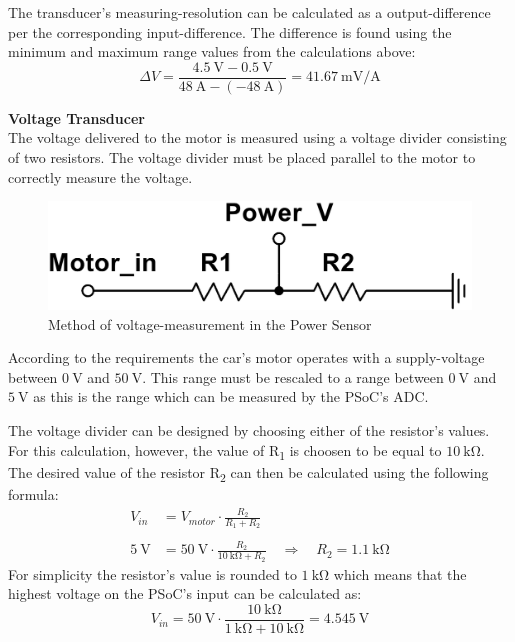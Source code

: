The transducer's measuring-resolution can be calculated as a output-difference per the corresponding input-difference. The difference is found using the minimum and maximum range values from the calculations above:
\begin{equation}
	\Delta V = \frac{\SI{4.5}{\volt} - \SI{0.5}{\volt}}{\SI{48}{\ampere} - (\SI{-48}{\ampere})} = \SI[per-mode = fraction]{41.67}{\milli \volt \per \ampere}
\end{equation}

\textbf{Voltage Transducer}\\
The voltage delivered to the motor is measured using a voltage divider consisting of two resistors. The voltage divider must be placed parallel to the motor to correctly measure the voltage.

\begin{figure}[H]
	\centering
	\includegraphics[width=0.5\linewidth]{Hardware/Pictures/PowerSensor_Voltage}
	\caption{Method of voltage-measurement in the Power Sensor}
	\label{fig:PowerSensorCurrent}
\end{figure}

According to the requirements the car's motor operates with a supply-voltage between $\SI{0}{\volt}$ and $\SI{50}{\volt}$. This range must be rescaled to a range between $\SI{0}{\volt}$ and $\SI{5}{\volt}$ as this is the range which can be measured by the PSoC's ADC.

The voltage divider can be designed by choosing either of the resistor's values. For this calculation, however, the value of R\textsubscript{1} is choosen to be equal to $\SI{10}{\kilo \ohm}$. The desired value of the resistor R\textsubscript{2} can then be calculated using the following formula:
\begin{equation}
	\begin{split}
	V_{in} &= V_{motor} \cdot \frac{R_2}{R_1 + R_2}\\
	\\
	\SI{5}{\volt} &= \SI{50}{\volt} \cdot \frac{R_2}{\SI{10}{\kilo \ohm} + R_2} \quad \Rightarrow \quad R_2 = \SI{1.1}{\kilo \ohm}
	\end{split}
\end{equation}
For simplicity the resistor's value is rounded to $\SI{1}{\kilo \ohm}$ which means that the highest voltage on the PSoC's input can be calculated as:
\begin{equation}
	V_{in} = \SI{50}{\volt} \cdot \frac{ \SI{10}{\kilo \ohm} }{ \SI{1}{\kilo \ohm} + \SI{10}{\kilo \ohm}} = \SI{4.545}{\volt}
\end{equation}
